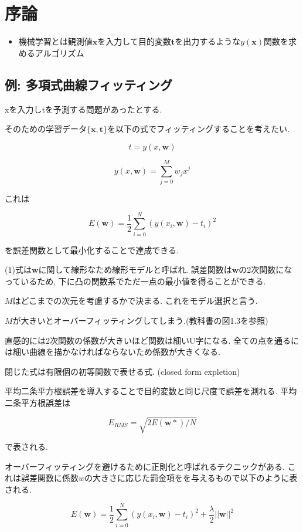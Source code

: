 \chapter{序論}

\begin{itemize}
    \item 機械学習とは観測値$\bm{x}$を入力して目的変数$\bm{t}$を出力するような$y(\bm{x})$関数を求めるアルゴリズム
\end{itemize}

\section{例: 多項式曲線フィッティング}

xを入力しtを予測する問題があったとする.

そのための学習データ$\{ \bm{x}, \bm{t} \}$を以下の式でフィッティングすることを考えたい.

$$ t = y(x, \bm{w}) $$

$$ y(x, \bm{w}) = \sum^{M}_{j=0}w_{j}x^j$$

これは

$$ E(\bm{w}) = \frac{1}{2}\sum^{N}_{i=0}(y(x_i, \bm{w}) - t_i)^2$$

を誤差関数として最小化することで達成できる.

(1)式は$\bm{w}$に関して線形なため線形モデルと呼ばれ. 誤差関数は$\bm{w}$の2次関数になっているため, 下に凸の関数系でただ一点の最小値を得ることができる.

$M$はどこまでの次元を考慮するかで決まる. これをモデル選択と言う.

$M$が大きいとオーバーフィッティングしてしまう.(教科書の図1.3を参照)

直感的には2次関数の係数が大きいほど関数は細いU字になる. 
全ての点を通るには細い曲線を描かなければならないため係数が大きくなる.

閉じた式は有限個の初等関数で表せる式. (closed form expletion)

平均二条平方根誤差を導入することで目的変数と同じ尺度で誤差を測れる.
平均二条平方根誤差は

$$ E_{RMS} = \sqrt{2E(\bm{w}*)/N} $$

で表される.

オーバーフィッティングを避けるために正則化と呼ばれるテクニックがある.
これは誤差関数に係数$w$の大きさに応じた罰金項をを与えるもので以下のように表される.

$$ E(\bm{w}) = \frac{1}{2}\sum^{N}_{i=0}(y(x_i, \bm{w}) - t_i)^2 + \frac{\lambda}{2}||\bm{w}||^2 $$


